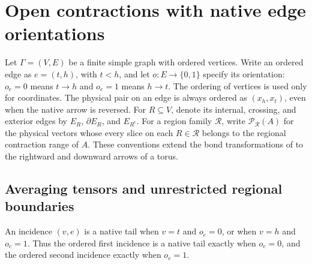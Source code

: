 \section{Open contractions with native edge orientations}
\label{sec:peps_oriented_open_contractions}

Let $\Gamma=(V,E)$ be a finite simple graph with ordered vertices.
Write an ordered edge as $e=(t,h)$, with $t<h$, and let
$o:E\to\{0,1\}$ specify its orientation: $o_e=0$ means $t\to h$
and $o_e=1$ means $h\to t$. The ordering of vertices is used only
for coordinates. The physical pair on an edge is always ordered as
$(x_h,x_t)$, even when the native arrow is reversed.
For $R\subseteq V$, denote its internal, crossing, and exterior edges by
$E_R$, $\partial E_R$, and $E_{R^c}$.
For a region family $\mathcal R$, write $\mathcal P_{\mathcal R}(A)$
for the physical vectors whose every slice on each $R\in\mathcal R$
belongs to the regional contraction range of $A$.
These conventions extend the bond transformations of
\cite[Section~7]{Schuch2010PEPS} to the rightward and downward arrows
of a torus.

\subsection{Averaging tensors and unrestricted regional boundaries}

\begin{definition}%
    \label{def:peps_oriented_native_tail}
    \leanok
    An incidence $(v,e)$ is a native tail when $v=t$ and $o_e=0$,
    or when $v=h$ and $o_e=1$.
    Thus the ordered first incidence is a native tail exactly when
    $o_e=0$, and the ordered second incidence exactly when $o_e=1$.
\end{definition}

